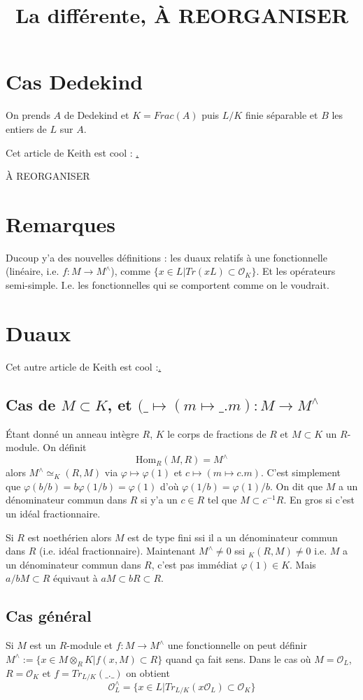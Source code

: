 \documentclass[a4paper,12pt]{book}
\title{La différente, À REORGANISER}
\date{}
\newcommand{\Or}{\mathcal{O}}
\newcommand{\Hom}{\textrm{Hom}}
\theoremstyle{plain}
\theoremstyle{definition}
\theoremstyle{remark}
\begin{document}
\maketitle
\section{Cas Dedekind}
On prends $A$ de Dedekind et $K=Frac(A)$ puis $L/K$
finie séparable et $B$ les entiers de $L$ sur $A$.




Cet article de Keith est cool : \href{https://kconrad.math.uconn.edu/blurbs/gradnumthy/different.pdf}.

À REORGANISER
\section{Remarques}
Ducoup y'a des nouvelles définitions : les duaux relatifs à
une fonctionnelle (linéaire, i.e. $f\colon M\to M^\wedge$), comme 
$\{x\in L|Tr(xL)\subset \Or_K\}$. Et les opérateurs semi-simple.
I.e. les fonctionnelles qui se comportent comme on le voudrait.

\section{Duaux}
Cet autre article de Keith est cool :\href{https://kconrad.math.uconn.edu/blurbs/linmultialg/dualmod.pdf}.

\subsection{Cas de $M\subset K$, et $(\_\mapsto (m\mapsto \_.m)\colon M\to M^\wedge$}
Étant donné un anneau intègre $R$, $K$ le corps de fractions de
$R$ et $M\subset K$ un $R$-module. On définit
\[\Hom_R(M,R)=M^\wedge\]
alors $M^\wedge\simeq _K(R,M)$ via $\varphi\mapsto \varphi(1)$
et $c\mapsto (m\mapsto c.m)$. C'est simplement que $\varphi(b/b)=
b\varphi(1/b)=\varphi(1)$ d'où $\varphi(1/b)=\varphi(1)/b$. On dit
que $M$ a un dénominateur commun dans $R$ si y'a un $c\in R$ tel
que $M\subset c^{-1}R$.
En gros si c'est un idéal fractionnaire.

Si $R$ est noethérien alors $M$ est de type fini ssi il a un
dénominateur commun dans $R$ (i.e. idéal fractionnaire).
Maintenant $M^\wedge\ne 0$ ssi $_K(R,M)\ne 0$ i.e. $M$ a un
dénominateur commun dans $R$, c'est pas immédiat $\varphi(1)\in K$.
Mais $a/bM\subset R$ équivaut à $aM\subset bR\subset R$.
\subsection{Cas général}
Si $M$ est un $R$-module et $f\colon M\to M^\wedge$ une fonctionnelle
on peut définir $M^\wedge:=\{x\in M\otimes_R K| f(x,M)\subset R\}$
quand ça fait sens. Dans le cas où $M=\Or_L$, $R=\Or_K$ et $f=Tr_{L/K}(\_.\_)$
on obtient
\[\Or_L^\wedge=\{x\in L| Tr_{L/K}(x\Or_L)\subset \Or_K\}\]
\end{document}
